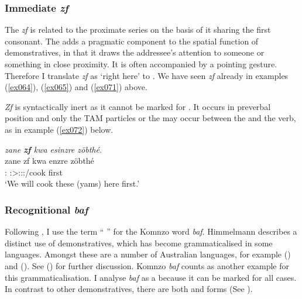 \subsubsection{Immediate \emph{zf}} \label{immediate-dem}

The   \emph{zf} is related to the proximate series on the basis of it sharing the first consonant. The  adds a pragmatic component to the spatial function of demonstratives, in that it draws the addressee's attention to someone or something in close proximity. It is often accompanied by a pointing gesture. Therefore I translate \emph{zf} as `right here' to . We have seen \emph{zf} already in examples (\ref{ex064}), (\ref{ex065}) and (\ref{ex071}) above.%

\emph{Zf} is syntactically inert as it cannot be marked for . It occurs in preverbal position and only the TAM particles or the  may occur between the   and the verb, as in example (\ref{ex072}) below.

\begin{exe}
	\ex \emph{zane \textbf{zf} kwa esinzre zöbthé.}\\
	\gll zane zf kwa enzre zöbthé\\
	\Dem{}:\Prox{} \Imm{} \Fut{} \Fpl:\Sbj>\Stpl:\Obj:\Nonpast:\Ipfv/cook first\\
	\trans `We will cook these (yams) here first.' 
	\label{ex072}
\end{exe}

\subsubsection{Recognitional \emph{baf}} \label{recognitional-pronoun}

Following \citep{Himmelmann:1996tp}, I use the term `` '' for the Komnzo word \textit{baf}. Himmelmann describes a distinct  use of demonstratives, which has become grammaticalised in some languages. Amongst these are a number of Australian languages, for example  (\citealt{Heath:1984uk}) and  (\citealt{Goddard:1985tw}). See (\citealt[231ff.]{Himmelmann:1996tp}) for further discussion. Komnzo \emph{baf} counts as another example for this grammaticalisation. I analyse \emph{baf} as a  because it can be marked for all cases. In contrast to other demonstratives, there are both  and  forms (See ).%

